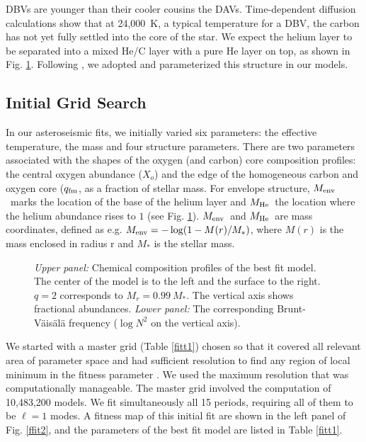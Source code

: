 \documentclass[12pt,preprint]{aastex}
\newcommand{\bvf}{Brunt-V\"ais\"al\"a }
\newcommand{\menv}{$M_{\rm env}$}
\newcommand{\mhe}{$M_{\rm He}$}
\newcommand{\xo}{$X_o$}
\newcommand{\qfm}{$q_{\rm fm}$}
\begin{document}
DBVs are younger than their cooler cousins the DAVs. Time-dependent diffusion calculations 
\citep[e.g.][]{Dehner95,Althaus05} show that at 24{,}000~K, a typical temperature for a DBV, 
the carbon has not yet fully settled into the core of the star. We expect the helium layer to 
be separated into a mixed He/C layer with a pure He layer on top, as shown in Fig. \ref{ffit1}. 
Following \citet{Metcalfe05a}, we adopted and parameterized this structure in our models. 

\subsection{Initial Grid Search}
\label{grids}

In our asteroseismic fits, we initially varied six parameters: the effective temperature, 
the mass and four structure parameters. There are two parameters associated with the shapes 
of the oxygen (and carbon) core composition profiles: the central oxygen abundance (\xo) and 
the edge of the homogeneous carbon and oxygen core (\qfm, as a fraction of stellar mass. 
For envelope structure, \menv\ marks the location of the base of the helium layer 
and \mhe\ the location where the helium abundance rises to $1$ (see Fig. \ref{ffit1}). 
\menv\ and \mhe\ are mass coordinates, defined as e.g. $M_{\rm env} = -\log(1 - M(r)/M_*)$, 
where $M(r)$ is the mass enclosed in radius r and $M_*$ is the stellar mass. 

\begin{figure}
\caption{
{\em Upper panel:} Chemical composition profiles of the best fit model. The center of the model is 
to the left and the surface to the right.  $q=2$ corresponds to $M_r = 0.99 \: M_*$. The vertical axis
shows fractional abundances. 
{\em Lower panel:} The corresponding \bvf frequency ($\log{N^2}$ on the vertical axis). \label{ffit1}
}
\end{figure}

We started with a master grid (Table \ref{fitt1}) chosen so that it covered all relevant 
area of parameter space and had sufficient resolution to find any region of local minimum 
in the fitness parameter \citep{Bischoff-Kim11a,Bischoff-Kim14}. We used the maximum resolution 
that was computationally manageable. The master grid involved the computation 
of 10,483,200 models. We fit simultaneously all 15 periods, requiring all of them to be $\ell=1$ 
modes. A fitness map of this initial fit are shown in the left panel of Fig. \ref{ffit2}, and the 
parameters of the best fit model are listed in Table \ref{fitt1}.
\end{document}
